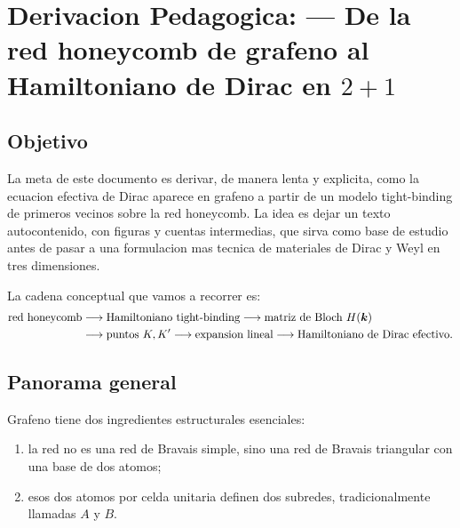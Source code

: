 \chapter{Derivacion Pedagogica: --- De la red honeycomb de grafeno al Hamiltoniano de Dirac en \(2+1\)}
\label{ch:derivacion-grafeno-a-dirac}







\section{Objetivo}

La meta de este documento es derivar, de manera lenta y explicita, como la ecuacion efectiva de Dirac aparece en grafeno a partir de un modelo tight-binding de primeros vecinos sobre la red honeycomb. La idea es dejar un texto autocontenido, con figuras y cuentas intermedias, que sirva como base de estudio antes de pasar a una formulacion mas tecnica de materiales de Dirac y Weyl en tres dimensiones.

La cadena conceptual que vamos a recorrer es:
\[
\begin{aligned}
\text{red honeycomb}
&\longrightarrow
\text{Hamiltoniano tight-binding}
\longrightarrow
\text{matriz de Bloch } H(\bm{k})
\\
&\longrightarrow
\text{puntos } K,K'
\longrightarrow
\text{expansion lineal}
\longrightarrow
\text{Hamiltoniano de Dirac efectivo.}
\end{aligned}
\]

\section{Panorama general}

Grafeno tiene dos ingredientes estructurales esenciales:

\begin{enumerate}[leftmargin=*]
  \item la red no es una red de Bravais simple, sino una red de Bravais triangular con una base de dos atomos;
  \item esos dos atomos por celda unitaria definen dos subredes, tradicionalmente llamadas \(A\) y \(B\).
\end{enumerate}

